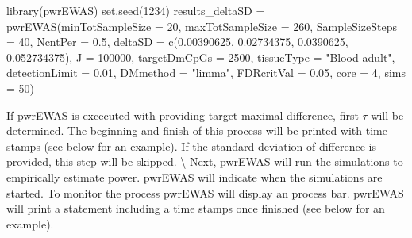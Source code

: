 \documentclass[]{article}
\newcommand{\hlnum}[1]{\textcolor[rgb]{0.816,0.125,0.439}{#1}}%
\newcommand{\hlstr}[1]{\textcolor[rgb]{0.251,0.627,0.251}{#1}}%
\newcommand{\hlstd}[1]{\textcolor[rgb]{0.251,0.251,0.251}{#1}}%
\newcommand{\hlkwc}[1]{\textcolor[rgb]{0.251,0.251,0.251}{#1}}%
\newcommand{\hlkwd}[1]{\textcolor[rgb]{0.878,0.439,0.125}{#1}}%
\newenvironment{Shaded}{\begin{myshaded}}{\end{myshaded}}
\newcommand{\KeywordTok}[1]{\hlkwd{#1}}
\newcommand{\DataTypeTok}[1]{\hlkwc{#1}}
\newcommand{\DecValTok}[1]{\hlnum{#1}}
\newcommand{\FloatTok}[1]{\hlnum{#1}}
\newcommand{\StringTok}[1]{\hlstr{#1}}
\newcommand{\NormalTok}[1]{\hlstd{#1}}
\begin{document}
\begin{Shaded}
\begin{Highlighting}[]
\KeywordTok{library}\NormalTok{(pwrEWAS)}
\KeywordTok{set.seed}\NormalTok{(}\DecValTok{1234}\NormalTok{)}
\NormalTok{results_deltaSD =}\StringTok{ }\KeywordTok{pwrEWAS}\NormalTok{(}\DataTypeTok{minTotSampleSize =} \DecValTok{20}\NormalTok{,}
                    \DataTypeTok{maxTotSampleSize =} \DecValTok{260}\NormalTok{, }
                    \DataTypeTok{SampleSizeSteps =} \DecValTok{40}\NormalTok{,}
                    \DataTypeTok{NcntPer =} \FloatTok{0.5}\NormalTok{,}
                    \DataTypeTok{deltaSD =} \KeywordTok{c}\NormalTok{(}\FloatTok{0.00390625}\NormalTok{, }\FloatTok{0.02734375}\NormalTok{, }\FloatTok{0.0390625}\NormalTok{, }\FloatTok{0.052734375}\NormalTok{),}
                    \DataTypeTok{J =} \DecValTok{100000}\NormalTok{, }
                    \DataTypeTok{targetDmCpGs =} \DecValTok{2500}\NormalTok{, }
                    \DataTypeTok{tissueType =} \StringTok{"Blood adult"}\NormalTok{,}
                    \DataTypeTok{detectionLimit =} \FloatTok{0.01}\NormalTok{,}
                    \DataTypeTok{DMmethod =} \StringTok{"limma"}\NormalTok{,}
                    \DataTypeTok{FDRcritVal =} \FloatTok{0.05}\NormalTok{,}
                    \DataTypeTok{core =} \DecValTok{4}\NormalTok{,}
                    \DataTypeTok{sims =} \DecValTok{50}\NormalTok{)}
\end{Highlighting}
\end{Shaded}

If pwrEWAS is excecuted with providing target maximal difference, first
\(\tau\) will be determined. The beginning and finish of this process
will be printed with time stamps (see below for an example). If the
standard deviation of difference is provided, this step will be skipped.
\textbackslash{} Next, pwrEWAS will run the simulations to empirically
estimate power. pwrEWAS will indicate when the simulations are started.
To monitor the process pwrEWAS will display an process bar. pwrEWAS will
print a statement including a time stamps once finished (see below for
an example).

\begin{Shaded}
\end{Shaded}
\end{document}

